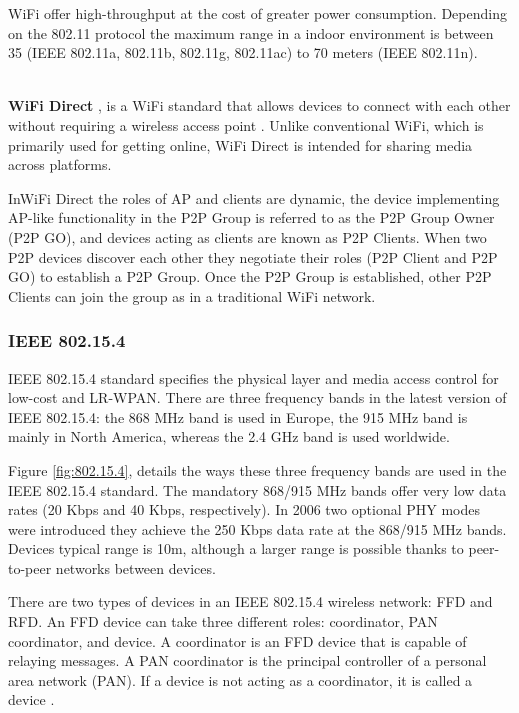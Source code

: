 \ac{WiFi} offer high-throughput at the cost of greater power consumption. Depending on the 802.11 protocol the maximum range in a indoor environment is between 35 (\ac{IEEE} 802.11a, 802.11b, 802.11g, 802.11ac) to 70 meters (\ac{IEEE} 802.11n).

\mbox{}\\
\textbf{\ac{WiFi} Direct} \cite{wifi_direct,wifi_direct2},  is a \ac{WiFi} standard that allows devices to connect with each other without requiring a wireless access point .
Unlike conventional \ac{WiFi}, which is primarily used for getting online, \ac{WiFi} Direct is intended for sharing media across platforms.

In\ac{WiFi} Direct the roles of AP and clients are dynamic, the device implementing AP-like functionality in the \ac{P2P} Group is referred to as the \ac{P2P} Group Owner (\ac{P2P} GO), and devices acting as clients are known as \ac{P2P} Clients. When two \ac{P2P} devices discover each other they negotiate their roles (\ac{P2P} Client and \ac{P2P} GO) to establish a \ac{P2P} Group. Once the \ac{P2P} Group is established, other \ac{P2P} Clients can join the group as in a traditional \ac{WiFi} network.



\subsubsection{IEEE 802.15.4}

\ac{IEEE} 802.15.4 standard\cite{livro_zigbee} specifies the physical layer and media access control for low-cost and \ac{LR-WPAN}.
There are three frequency bands in the latest version of \ac{IEEE} 802.15.4: the 868 MHz band is used in Europe, the 915 MHz band is mainly in North America, whereas the 2.4 GHz band is used worldwide.

Figure \ref{fig:802.15.4}, details the ways these three frequency bands are used in the \ac{IEEE} 802.15.4 standard.
The mandatory 868/915 MHz bands offer very low data rates (20 Kbps and 40 Kbps, respectively). In 2006 two optional \ac{PHY} modes were introduced they achieve the 250 Kbps data rate at the 868/915 MHz bands.
Devices typical range is 10m, although a larger range is possible thanks to peer-to-peer networks between devices.

There are two types of devices in an \ac{IEEE} 802.15.4 wireless network: \ac{FFD} and \ac{RFD}. An FFD device can take three different roles: coordinator, PAN coordinator, and device. A coordinator is an FFD device that is capable of relaying messages. A PAN coordinator is the principal controller of a personal area network
(PAN). If a device is not acting as a coordinator, it is called a device .

